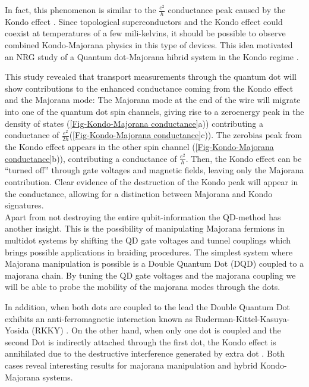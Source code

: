 In fact, this phenomenon is similar to the $\frac{e^{2}}{h}$ conductance peak caused by the Kondo effect \citep{hewson_kondo_1997}. Since topological superconductors and the Kondo effect could coexist at temperatures of a few mili-kelvins, it should be possible to observe combined Kondo-Majorana physics in this type of devices. This idea motivated an NRG study of a Quantum dot-Majorana hibrid system in the Kondo regime  \citep{ruiz-tijerina_interaction_2015}. 


This study revealed that transport measurements
through the quantum dot will show contributions to the enhanced conductance
coming from the Kondo effect and the Majorana mode: The Majorana mode
at the end of the wire will migrate into one of the quantum dot spin channels,
giving rise to a zero\textendash energy peak in the density of states
(\ref{Fig-Kondo-Majorana conductance}a)) contributing a conductance
of $\frac{e^{2}}{2h}$(\ref{Fig-Kondo-Majorana conductance}c)). The
zero\textendash bias peak from the Kondo effect appears in the other
spin channel (\ref{Fig-Kondo-Majorana conductance}b)), contributing
a conductance of $\frac{e^{2}}{h}$. Then, the Kondo effect can be
\textquotedblleft turned off\textquotedblright{} through gate voltages
and magnetic fields, leaving only the Majorana contribution. Clear
evidence of the destruction of the Kondo peak will appear in the conductance,
allowing for a distinction between Majorana and Kondo signatures.\\



 Apart from not destroying the entire qubit-information the QD-method has another insight.  This is the possibility of manipulating  Majorana fermions  in multidot systems by shifting the QD gate voltages and tunnel couplings which brings possible applications in  braiding procedures. The simplest system where Majorana manipulation is possible is  a  Double Quantum Dot (DQD) coupled to a majorana chain. By tuning the QD gate voltages and the majorana coupling we will be able to probe the mobility of the majorana modes through the dots. 
 
In addition, when both dots are coupled to the lead the Double Quantum Dot exhibits an anti-ferromagnetic interaction known as  Ruderman-Kittel-Kasuya-Yosida (RKKY) \cite{ruderman_indirect_1954,kasuya_theory_1956,yosida_magnetic_1957}. On the other hand, when only one dot is coupled  and the second Dot is indirectly attached through the first dot,  the Kondo effect is annihilated due to the destructive interference  generated by extra dot \cite{dias_da_silva_transmission_2008}. Both cases reveal interesting results for majorana manipulation and hybrid Kondo-Majorana systems.

